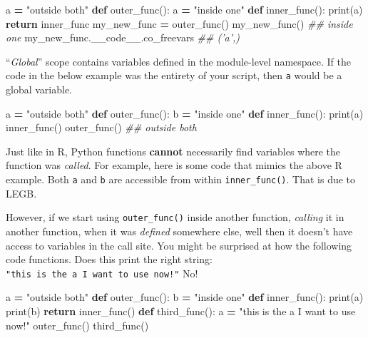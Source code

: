 \documentclass[12pt,krantz2]{krantz}
\makeatletter
\newenvironment{Shaded}{\begin{snugshade}}{\end{snugshade}}
\newcommand{\BuiltInTok}[1]{#1}
\newcommand{\CommentTok}[1]{\textcolor[rgb]{0.37,0.37,0.37}{\textit{#1}}}
\newcommand{\ControlFlowTok}[1]{\textcolor[rgb]{0.27,0.27,0.27}{\textbf{#1}}}
\newcommand{\KeywordTok}[1]{\textcolor[rgb]{0.27,0.27,0.27}{\textbf{#1}}}
\newcommand{\NormalTok}[1]{#1}
\newcommand{\OperatorTok}[1]{\textcolor[rgb]{0.43,0.43,0.43}{\textbf{#1}}}
\newcommand{\StringTok}[1]{\textcolor[rgb]{0.5,0.5,0.5}{#1}}
\newenvironment{kframe}{%
\medskip{}
\setlength{\fboxsep}{.8em}
 \def\at@end@of@kframe{}%
 \ifinner\ifhmode%
  \def\at@end@of@kframe{\end{minipage}}%
  \begin{minipage}{\columnwidth}%
 \fi\fi%
 \def\FrameCommand##1{\hskip\@totalleftmargin \hskip-\fboxsep
 \colorbox{shadecolor}{##1}\hskip-\fboxsep
     \hskip-\linewidth \hskip-\@totalleftmargin \hskip\columnwidth}%
 \MakeFramed {\advance\hsize-\width
   \@totalleftmargin\z@ \linewidth\hsize
   \@setminipage}}%
 {\par\unskip\endMakeFramed%
 \at@end@of@kframe}
\renewenvironment{Shaded}{\begin{kframe}}{\end{kframe}}
\makeatother
\begin{document}
\begin{Shaded}
\begin{Highlighting}[]
\NormalTok{a }\OperatorTok{=} \StringTok{"outside both"}
\KeywordTok{def}\NormalTok{ outer_func():}
\NormalTok{    a }\OperatorTok{=} \StringTok{"inside one"}
    \KeywordTok{def}\NormalTok{ inner_func():}
        \BuiltInTok{print}\NormalTok{(a)}
    \ControlFlowTok{return}\NormalTok{ inner_func}
\NormalTok{my_new_func }\OperatorTok{=}\NormalTok{ outer_func()}
\NormalTok{my_new_func()}
\CommentTok{## inside one}
\NormalTok{my_new_func.__code__.co_freevars}
\CommentTok{## ('a',)}
\end{Highlighting}
\end{Shaded}

``\emph{Global}'' scope contains variables defined in the module-level namespace. If the code in the below example was the entirety of your script, then \texttt{a} would be a global variable.

\begin{Shaded}
\begin{Highlighting}[]
\NormalTok{a }\OperatorTok{=} \StringTok{"outside both"}
\KeywordTok{def}\NormalTok{ outer_func():}
\NormalTok{    b }\OperatorTok{=} \StringTok{"inside one"}
    \KeywordTok{def}\NormalTok{ inner_func():}
        \BuiltInTok{print}\NormalTok{(a) }
\NormalTok{    inner_func()}
\NormalTok{outer_func()}
\CommentTok{## outside both}
\end{Highlighting}
\end{Shaded}

Just like in R, Python functions \textbf{cannot} necessarily find variables where the function was \emph{called}. For example, here is some code that mimics the above R example. Both \texttt{a} and \texttt{b} are accessible from within \texttt{inner\_func()}. That is due to LEGB.

However, if we start using \texttt{outer\_func()} inside another function, \emph{calling} it in another function, when it was \emph{defined} somewhere else, well then it doesn't have access to variables in the call site. You might be surprised at how the following code functions. Does this print the right string: \texttt{"this\ is\ the\ a\ I\ want\ to\ use\ now!"} No!

\begin{Shaded}
\begin{Highlighting}[]
\NormalTok{a }\OperatorTok{=} \StringTok{"outside both"}
\KeywordTok{def}\NormalTok{ outer_func():}
\NormalTok{    b }\OperatorTok{=} \StringTok{"inside one"}
    \KeywordTok{def}\NormalTok{ inner_func():}
        \BuiltInTok{print}\NormalTok{(a) }
        \BuiltInTok{print}\NormalTok{(b)}
    \ControlFlowTok{return}\NormalTok{ inner_func() }
\KeywordTok{def}\NormalTok{ third_func():}
\NormalTok{    a }\OperatorTok{=} \StringTok{"this is the a I want to use now!"}
\NormalTok{    outer_func()}
\NormalTok{third_func() }
\end{Highlighting}
\end{Shaded}
\end{document}
